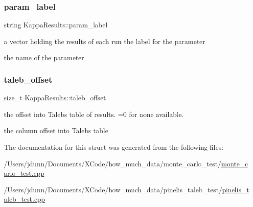 \subsubsection{\texorpdfstring{param\+\_\+label}{param\_label}}
{\footnotesize\ttfamily string Kappa\+Results\+::param\+\_\+label}



a vector holding the results of each run the label for the parameter 

the name of the parameter \mbox{\label{structKappaResults_a133dbed775f98f56566b9571ff05746d}} 
\subsubsection{\texorpdfstring{taleb\+\_\+offset}{taleb\_offset}}
{\footnotesize\ttfamily size\+\_\+t Kappa\+Results\+::taleb\+\_\+offset}



the offset into Taleb\textquotesingle{}s table of results. =0 for none available. 

the column offset into Taleb\textquotesingle{}s table 

The documentation for this struct was generated from the following files\+:\begin{DoxyCompactItemize}
\item 
/\+Users/jdunn/\+Documents/\+X\+Code/how\+\_\+much\+\_\+data/monte\+\_\+carlo\+\_\+test/\mbox{\hyperlink{monte__carlo__test_8cpp}{monte\+\_\+carlo\+\_\+test.\+cpp}}\item 
/\+Users/jdunn/\+Documents/\+X\+Code/how\+\_\+much\+\_\+data/pinelis\+\_\+taleb\+\_\+test/\mbox{\hyperlink{pinelis__taleb__test_8cpp}{pinelis\+\_\+taleb\+\_\+test.\+cpp}}\end{DoxyCompactItemize}

